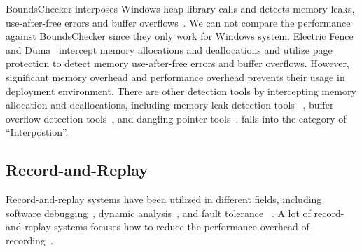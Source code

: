 BoundsChecker interposes Windows heap library calls and detects memory leaks, use-after-free errors and buffer overflows~\cite{BoundsChecker}. We can not compare the performance against BoundsChecker since they only work for Windows system. Electric Fence~\cite{electricfence} and Duma~\cite{duma} intercept memory allocations and deallocations and utilize page protection to detect memory use-after-free errors and buffer overflows. However, significant memory overhead and performance overhead prevents their usage in deployment environment. There are other detection tools by intercepting memory allocation and deallocations, including memory leak detection tools ~\cite{Hound, SWAT,Sleigh}, buffer overflow detection tools~\cite{exterminator, Dlmalloc, GuardMalloc, overflow:Cruiser}, and dangling pointer tools~\cite{Undangle}. \doubletake{} falls into the category of ``Interpostion''.  
 
\subsection{Record-and-Replay}

Record-and-replay systems have been utilized in different fields, including software debugging~\cite{Triage, Flashback, OSDebug, RecPlay}, dynamic analysis~\cite{Aftersight, Speck}, and fault tolerance ~\cite{Bressoud:1995:HFT:224056.224058, Rx}. A lot of record-and-replay systems focuses how to reduce the performance overhead of recording~\cite{Respec, ODR, PRES, DoublePlay}. 

